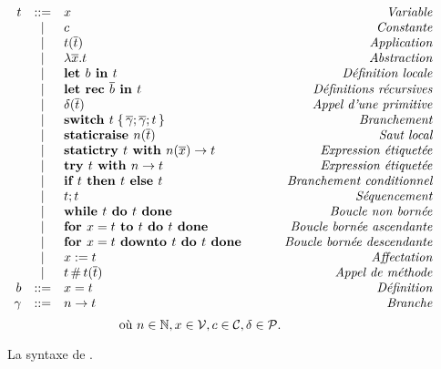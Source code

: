 \begin{figure}

\[
\begin{array}{rclr}
t
  & ::= & x & \qquad\textit{Variable} \\
  & |   & c & \qquad\textit{Constante} \\
  & |   & t (\overline{t}) & \qquad\textit{Application} \\
  & |   & \lambda \overline{x}. t & \qquad\textit{Abstraction} \\
  & |   & \textbf{let }b \textbf{ in } t & \qquad\textit{Définition locale} \\
  & |   & \textbf{let rec }\overline{b} \textbf{ in } t & \qquad\textit{Définitions récursives} \\
  & |   & \delta (\overline{t}) & \qquad\textit{Appel d'une primitive} \\
  & |   & \textbf{switch } t \;\{\, \overline{\gamma}; \overline{\gamma}; t \,\}
        & \qquad\textit{Branchement} \\
  & |   & \textbf{staticraise } n (\overline{t}) & \qquad\textit{Saut local} \\
  & |   & \textbf{statictry } t \textbf{ with } n (\overline{x}) \rightarrow t & \qquad\textit{Expression étiquetée} \\
  & |   & \textbf{try } t \textbf{ with } n \rightarrow t & \qquad\textit{Expression étiquetée} \\
  & |   & \textbf{if } t \textbf{ then } t \textbf{ else } t & \qquad\textit{Branchement conditionnel} \\
  & |   & t ; t & \qquad\textit{Séquencement} \\
  & |   & \textbf{while } t \textbf{ do } t \textbf{ done } & \qquad\textit{Boucle non bornée} \\
  & |   & \textbf{for } x = t \textbf{ to } t \textbf{ do } t \textbf{ done } & \qquad\textit{Boucle bornée ascendante} \\
  & |   & \textbf{for } x = t \textbf{ downto } t \textbf{ do } t \textbf{ done } & \qquad\textit{Boucle bornée descendante} \\
  & |   & x := t & \qquad\textit{Affectation} \\
  & |   & t \,\#\, t (\overline{t}) & \qquad\textit{Appel de méthode} \\
b & ::= & x = t & \qquad\textit{Définition} \\
\gamma  & ::= & n \rightarrow t & \qquad\textit{Branche} \\
\end{array}
\]
\[
\textrm{où }
n \in \mathbb{N},
x \in \mathcal{V},
c \in \mathcal{C},
\delta \in \mathcal{P}.
\]

\caption{La syntaxe de {\LambdaCode}.}
\label{fig:lambda-syntax}
\end{figure}
